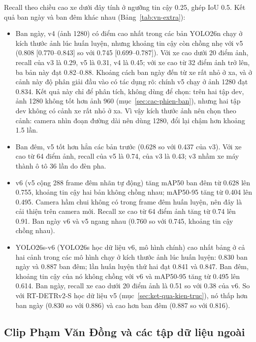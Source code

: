 Recall theo chiều cao xe dưới đây tính ở ngưỡng tin cậy 0.25, ghép IoU 0.5. Kết quả ban ngày và ban đêm khác nhau
(Bảng~\ref{tab:vn-extra}):
\begin{itemize}
  \item Ban ngày, v4 (ảnh 1280) có điểm cao nhất trong các bản YOLO26n chạy ở kích thước ảnh lúc huấn luyện,
        nhưng khoảng tin cậy còn chồng nhẹ với v5 (0.808 [0.770--0.843] so với 0.745 [0.699--0.787]). Với xe cao dưới
        20 điểm ảnh, recall của v3 là 0.29, v5 là 0.31, v4 là 0.45; với xe cao từ 32 điểm ảnh trở lên, ba bản này đạt
        0.82--0.88. Khoảng cách ban ngày đến từ xe rất nhỏ ở xa, và ở cảnh này độ phân giải đầu vào có tác dụng rõ:
        chính v5 chạy ở ảnh 1280 đạt 0.834. Kết quả này chỉ để phân tích, không dùng để chọn: trên hai tập dev, ảnh
        1280 không tốt hơn ảnh 960 (mục~\ref{sec:cac-phien-ban}), nhưng hai tập dev không có cảnh xe rất nhỏ ở xa. Vì
        vậy kích thước ảnh nên chọn theo cảnh: camera nhìn đoạn đường dài nên dùng 1280, đổi lại chậm hơn khoảng 1.5 lần.
  \item Ban đêm, v5 tốt hơn hẳn các bản trước (0.628 so với 0.437 của v3). Với xe cao từ 64 điểm ảnh, recall
        của v5 là 0.74, của v3 là 0.43; v3 nhầm xe máy thành ô tô 36 lần do đèn pha.
  \item v6 (v5 cộng 288 frame đêm nhãn tự động) tăng mAP50 ban đêm từ 0.628 lên 0.755, khoảng tin cậy hai
        bản không chồng nhau; mAP50-95 tăng từ 0.404 lên 0.495. Camera hầm chui không có trong frame đêm huấn luyện, nên
        đây là cải thiện trên camera mới. Recall xe cao từ 64 điểm ảnh tăng từ 0.74 lên 0.91. Ban ngày v6 và v5 ngang
        nhau (0.760 so với 0.745, khoảng tin cậy chồng nhau).
  \item YOLO26s-v6 (YOLO26s học dữ liệu v6, mô hình chính) cao nhất bảng ở cả hai cảnh trong các mô hình chạy
        ở kích thước ảnh lúc huấn luyện: 0.830 ban ngày và 0.887 ban đêm; lần huấn luyện thứ hai đạt 0.841 và 0.847.
        Ban đêm, khoảng tin cậy của nó không chồng với v6 và mAP50-95 tăng từ 0.495 lên 0.614. Ban ngày, recall xe cao
        dưới 20 điểm ảnh là 0.51 so với 0.38 của v6. So với RT-DETRv2-S học dữ liệu v5 (mục~\ref{sec:ket-qua-kien-truc}),
        nó thấp hơn ban ngày (0.830 so với 0.886) và cao hơn ban đêm (0.887 so với 0.816).
\end{itemize}

\subsection{Clip Phạm Văn Đồng và các tập dữ liệu ngoài}

